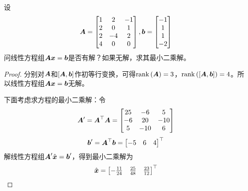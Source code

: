 \setcounter{problem}{25}
\begin{problem}
设
\begin{equation*}
    \boldsymbol{A}=
    \begin{bmatrix}
        1 & 2  & -1 \\
        2 & 0  & 1  \\
        2 & -4 & 2  \\
        4 & 0  & 0
    \end{bmatrix},
    \boldsymbol{b}=\begin{bmatrix}-1\\1\\1\\-2\end{bmatrix}
\end{equation*}
问线性方程组\(\boldsymbol{A}\boldsymbol{x}=\boldsymbol{b}\)是否有解？如果无解，求其最小二乘解。
\end{problem}
\begin{proof}
    分别对\(\boldsymbol{A}\)和\(\left[ \boldsymbol{A},\boldsymbol{b} \right]\)作初等行变换，可得\(\mathrm{rank}\left( \boldsymbol{A} \right)=3\)，\(\mathrm{rank}\left( \left[ \boldsymbol{A},\boldsymbol{b} \right] \right)=4\)。所以线性方程组\(\boldsymbol{A}\boldsymbol{x}=\boldsymbol{b}\)无解。

    下面考虑求方程的最小二乘解：令
    \begin{equation*}
        \boldsymbol{A}'=\boldsymbol{A}^\top\boldsymbol{A}=
        \begin{bmatrix}
            25 & -6  & 5   \\
            -6 & 20  & -10 \\
            5  & -10 & 6
        \end{bmatrix}
    \end{equation*}
    \begin{equation*}
        \boldsymbol{b}'=\boldsymbol{A}^\top\boldsymbol{b}=\begin{bmatrix}-5&6&4\end{bmatrix}^\top
    \end{equation*}
    解线性方程组\(\boldsymbol{A}'\hat{\boldsymbol{x}}=\boldsymbol{b}'\)，得到最小二乘解为
    \begin{equation*}
        \hat{\boldsymbol{x}}=
        \begin{bmatrix}
            -\frac{11}{24} & \frac{25}{48} & \frac{23}{12}
        \end{bmatrix}^\top
    \end{equation*}
\end{proof}

